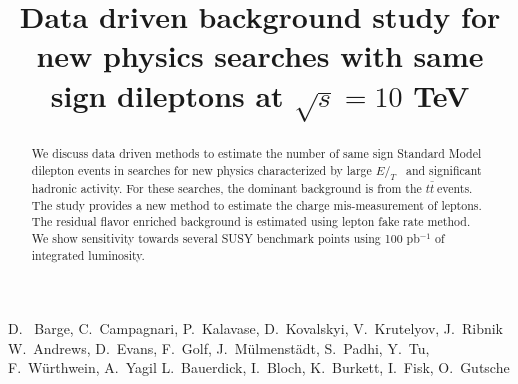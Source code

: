 \documentclass{cmspaper}
\newcommand{\met} {\ensuremath{E\!\!\!\!/_T}}
\newcommand{\ttbar} {\ensuremath{t\bar{t}~}}
\begin{document}
%
\begin{titlepage}
\title{Data driven background study for new physics searches with same sign dileptons at $\sqrt{s} = 10 $ TeV}

  \begin{Authlist}
    D.~ Barge, C.~Campagnari, P.~Kalavase, D.~Kovalskyi, V.~Krutelyov, J.~Ribnik
    W.~Andrews, D.~Evans, F.~Golf, J.~M\"ulmenst\"adt, S.~Padhi, Y.~Tu, F.~W\"urthwein, A.~Yagil
    L.~Bauerdick, I.~Bloch, K.~Burkett, I.~Fisk, O.~Gutsche
  \end{Authlist}

\begin{abstract}
We discuss data driven methods to estimate the number of same sign Standard Model dilepton
events in searches for new physics characterized by large \met~ and significant hadronic
activity.  For these searches, the dominant background is from the \ttbar events. The study 
provides a new method to estimate the charge mis-measurement of leptons. The residual
flavor enriched background is estimated using lepton fake rate method. We show sensitivity towards 
several SUSY benchmark points using 100 pb$^{-1}$ of integrated luminosity.
\end{abstract}
\end{titlepage}











\clearpage

\end{document}
